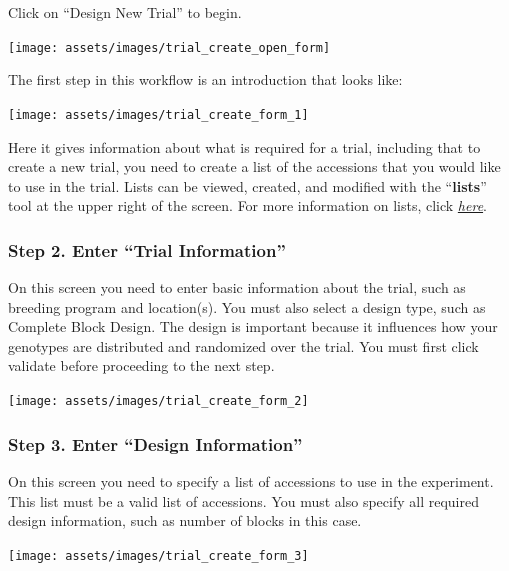 \documentclass[
  12pt,
]{book}
\begin{document}
Click on ``Design New Trial'' to begin.

\begin{center}\texttt{[image: assets/images/trial\_create\_open\_form]} \end{center}

The first step in this workflow is an introduction that looks like:

\begin{center}\texttt{[image: assets/images/trial\_create\_form\_1]} \end{center}

Here it gives information about what is required for a trial, including that to create a new trial, you need to create a list of the accessions that you would like to use in the trial. Lists can be viewed, created, and modified with the ``\textbf{lists}'' tool at the upper right of the screen. For more information on lists, click \protect\hyperlink{working-with-lists}{\emph{here}}.

\hypertarget{step-2.-enter-trial-information}{%
\subsubsection*{Step 2. Enter ``Trial Information''}\label{step-2.-enter-trial-information}}


On this screen you need to enter basic information about the trial, such as breeding program and location(s). You must also select a design type, such as Complete Block Design. The design is important because it influences how your genotypes are distributed and randomized over the trial. You must first click validate before proceeding to the next step.

\begin{center}\texttt{[image: assets/images/trial\_create\_form\_2]} \end{center}

\hypertarget{step-3.-enter-design-information}{%
\subsubsection*{Step 3. Enter ``Design Information''}\label{step-3.-enter-design-information}}


On this screen you need to specify a list of accessions to use in the experiment. This list must be a valid list of accessions. You must also specify all required design information, such as number of blocks in this case.

\begin{center}\texttt{[image: assets/images/trial\_create\_form\_3]} \end{center}
\end{document}
